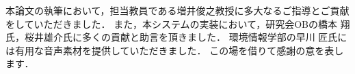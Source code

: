 \begin{acknowledgment}

本論文の執筆において，担当教員である増井俊之教授に多大なるご指導とご貢献をしていただきました．
また，本システムの実装において，研究会OBの橋本 翔氏，桜井雄介氏に多くの貢献と助言を頂きました．
環境情報学部の早川 匠氏には有用な音声素材を提供していただきました．
この場を借りて感謝の意を表します．

\end{acknowledgment}
